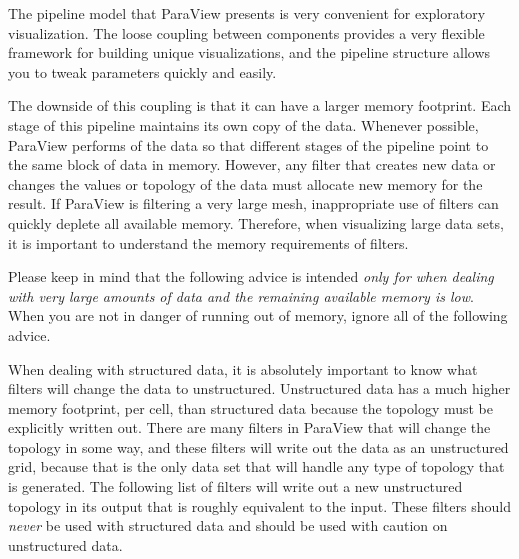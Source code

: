 The pipeline model that ParaView presents is very convenient for
exploratory visualization.  The loose coupling between components provides
a very flexible framework for building unique visualizations, and the
pipeline structure allows you to tweak parameters quickly and easily.

The downside of this coupling is that it can have a larger memory
footprint.  Each stage of this pipeline maintains its own copy of the data.
Whenever possible, ParaView performs  of the data
so that different stages of the pipeline point to the same block of data in
memory.  However, any filter that creates new data or changes the values or
topology of the data must allocate new memory for the result.  If ParaView
is filtering a very large mesh, inappropriate use of filters can quickly
deplete all available memory.  Therefore, when visualizing large data sets,
it is important to understand the memory requirements of filters.

Please keep in mind that the following advice is intended \emph{only for
  when dealing with very large amounts of data and the remaining available
  memory is low}.  When you are not in danger of running out of memory,
ignore all of the following advice.

When dealing with structured data, it is absolutely important to know what
filters will change the data to unstructured.  Unstructured data has a much
higher memory footprint, per cell, than structured data because the
topology must be explicitly written out.  There are many filters in
ParaView that will change the topology in some way, and these filters will
write out the data as an unstructured grid, because that is the only data
set that will handle any type of topology that is generated.  The following
list of filters will write out a new unstructured topology in its output
that is roughly equivalent to the input.  These filters should \emph{never}
be used with structured data and should be used with caution on
unstructured data.

